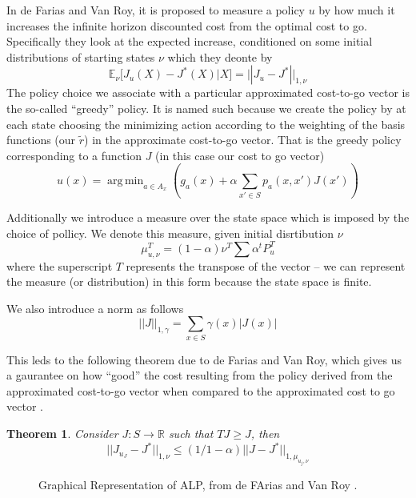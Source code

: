 \documentclass[12pt,reqno]{amsart}
\newtheorem{thm}{Theorem}[section]
\newcommand{\R}{\ensuremath{\mathbb{R}}}
\newcommand{\E}{\mathbb{E}}
\numberwithin{equation}{section}
\DeclareMathOperator*{\argmin}{arg\,min}
\begin{document}
In de Farias and Van Roy, it is proposed to measure a policy $u$ by how much it increases the infinite horizon discounted cost from the optimal cost to go. Specifically they look at the expected increase, conditioned on some initial distributions of starting states $\nu$ which they deonte by
$$
\E_{\nu}[ J_u(X) - J^*(X) | X] = ||J_u - J^*||_{1,\nu}
$$
The policy choice we associate with a particular approximated cost-to-go vector is the so-called ``greedy'' policy. It is named such because we create the policy by at each state choosing the minimizing action according to the weighting of the basis functions (our $\tilde{r}$) in the approximate cost-to-go vector. That is the greedy policy corresponding to a function $J$ (in this case our cost to go vector)
$$
u(x) = \argmin_{a \in A_x}(g_a(x) + \alpha\sum_{x' \in S} p_a(x,x')J(x'))
$$

Additionally we introduce a measure over the state space which is imposed by the choice of pollicy. We denote this measure, given initial disrtibution $\nu$
$$
\mu_{u,\nu}^T = (1-\alpha)\nu^T \sum \alpha^t P_u^T
$$
where the superscript $T$ represents the transpose of the vector -- we can represent the measure (or distribution) in this form because the state space is finite.

We also introduce a norm as follows
$$
||J||_{1,\gamma} = \sum_{x \in S} \gamma(x) | J(x) |
$$

This leds to the following theorem due to de Farias and Van Roy, which gives us a gaurantee on how ``good'' the cost resulting from the policy derived from the approximated cost-to-go vector when compared to the approximated cost to go vector \cite{FV}.

\begin{thm} \label{thm:alpbound}
Consider $J: S \rightarrow \R$ such that $TJ \geq J$, then
$$
||J_{u_J} - J^*||_{1,\nu} \leq (1/1-\alpha)||J - J^*||_{1,\mu_{u_j,\nu}}
$$
\end{thm}

\begin{figure}
\begin{center}
\caption{\label{fig:FV1} Graphical Representation of ALP, from de FArias and Van Roy \cite{FV}.}
\end{center}
\end{figure}
\end{document}
